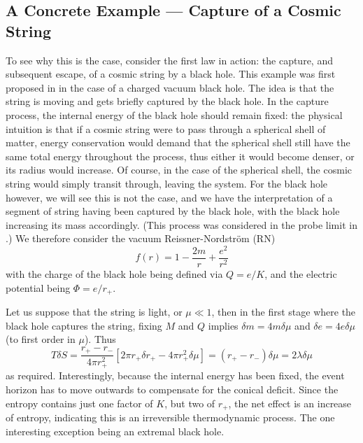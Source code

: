\documentclass[
twoside,
openright,
frontopenright
]{dmathesis}
\begin{document}
\subsection{A Concrete Example --- Capture of a Cosmic String}

To see why this is the case, consider the first law in action: the 
capture, and subsequent escape, of a cosmic string by a black hole. 
This example was first proposed in \cite{Bonjour:1998rf} in the
case of a charged vacuum black hole. 
The idea is that the string is moving and gets briefly captured by
the black hole. In the capture process, the internal energy of the black
hole should remain fixed: the physical intuition is that if a cosmic string
were to pass through a spherical shell of matter, energy conservation 
would demand that the spherical shell still have the same total energy
throughout the process,
thus either it would become denser, or its radius would increase.
Of course, in the case of the spherical shell, the cosmic string would simply
transit through, leaving the system. For the black hole however, we will
see this is not the case, and we have the interpretation of a segment of 
string having been captured by the black hole, with the black hole increasing
its mass accordingly. (This process was considered in the probe
limit in \cite{Lonsdale:1988xd,DeVilliers:1997nk}.)
We therefore consider the vacuum Reissner-Nordstr\"om (RN)
\begin{equation}
f(r) = 1  - \frac{2m}{r} + \frac{e^2}{r^2}
\end{equation}
with the charge of the black hole being defined via
$Q = e/K$, and the electric potential being
$\Phi = e/r_+$.

Let us suppose that the string is light, or $\mu \ll 1$, then in the first 
stage where the black hole captures the string, fixing $M$
and $Q$ implies $\delta m = 4 m \delta \mu$ and $\delta e = 4e\delta \mu$
(to first order in $\mu$). Thus
\begin{equation}
T \delta S = \frac{r_+-r_-}{4\pi r_+^2} \left [
2\pi r_+ \delta r_+ - 4\pi r_+^2 \delta\mu \right ]
= (r_+-r_-) \delta \mu = 2\lambda \delta \mu
\end{equation}
as required. Interestingly, because the internal energy has been fixed,
the event horizon has to move outwards to compensate for the conical 
deficit. Since the entropy contains just one factor of $K$, but two of $r_+$,
the net effect is an increase of entropy, indicating this is an irreversible
thermodynamic process. The one interesting exception being an extremal black
hole.
\end{document}
